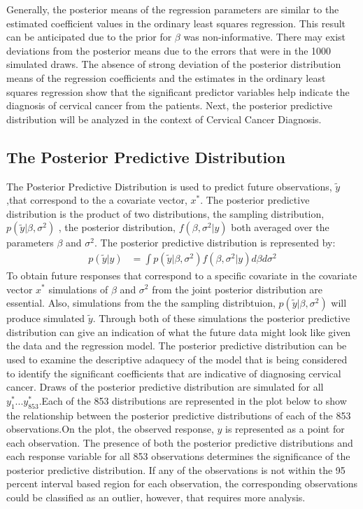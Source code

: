 \documentclass[12pt]{article}
\numberwithin{equation}{section}
\begin{document}
Generally, the posterior means of the regression parameters are similar to the estimated coefficient values in the ordinary least squares regression. This result can be anticipated due to the  prior for $\beta$ was non-informative. There may exist deviations from the posterior means due to the errors that were in the 1000 simulated draws. The absence of strong deviation of the posterior distribution means of the regression coefficients and  the estimates in the ordinary least squares regression show that the significant predictor variables help indicate the diagnosis of cervical cancer from the patients. Next, the posterior predictive distribution will be analyzed in the context of Cervical Cancer Diagnosis.

\subsection{The Posterior Predictive Distribution}

The Posterior Predictive Distribution is used to predict future observations, $\tilde{y}$,that correspond to the a covariate vector, $x^*$. The posterior predictive distribution is the product of two distributions, the sampling distribution, $p(\tilde{y}|\beta, \sigma^2)$ , the posterior distribution, $f(\beta, \sigma^2 | y)$ both averaged over the parameters $\beta$ and $\sigma^2$. The posterior predictive distribution is represented by: 
\begin{align}
p(\tilde{y}|y) & = \int p(\tilde{y}|\beta, \sigma^2)f(\beta, \sigma^2 | y)d\beta d\sigma^2
\end{align}
To obtain future responses that correspond to a specific covariate in the covariate vector $x^*$ simulations of $\beta$ and $\sigma^2$ from the joint posterior distribution are essential. Also, simulations from the the sampling distribtuion, $p(\tilde{y}|\beta, \sigma^2)$ will produce simulated $\tilde{y}$. Through both of these simulations the posterior predictive distribution can give an indication of what the future data might look like given the data and the regression model. The posterior predictive distribution can be used to examine the descriptive adaquecy of the model that is being considered to  identify the significant coefficients that are indicative of diagnosing cervical cancer. Draws of the posterior predictive distribution are simulated for all $y_1^* ... y_{853}^*$.Each of the 853 distributions are represented in the plot below to show the relationship between the posterior predictive distributions of each of the 853 observations.On the plot, the observed response, $y$ is represented as a point for each observation. The presence of both the posterior predictive distributions and each response variable for all 853 observations determines the significance of the posterior predictive distribution. If any of the observations is not within the 95 percent interval based region for each observation, the corresponding observations  could be classified as an outlier, however, that requires more analysis. 
\end{document}
